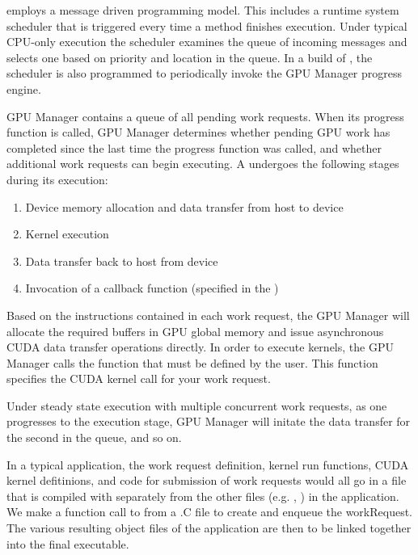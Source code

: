 \documentclass[10pt]{report}
\begin{document}
\charmpp{} employs a message driven programming model. This includes a runtime
system scheduler that is triggered every time a method finishes execution. Under
typical CPU-only execution the scheduler examines the queue of incoming messages
and selects one based on priority and location in the queue. In a \cuda{}
build of \charmpp{}, the scheduler is also programmed to periodically invoke the
GPU Manager progress engine.

GPU Manager contains a queue of all pending work requests. When its progress
function is called, GPU Manager determines whether pending GPU work has
completed since the last time the progress function was called, and whether
additional work requests can begin executing. A  undergoes the
following stages during its execution:

\begin{enumerate}
\item Device memory allocation and data transfer from host to device
\item Kernel execution
\item Data transfer back to host from device
\item Invocation of a callback function (specified in the )
\end{enumerate}

Based on the instructions contained in each work request, the GPU Manager will
allocate the required buffers in GPU global memory and issue asynchronous CUDA
data transfer operations directly. In order to execute kernels, the GPU Manager
calls the  function that must be defined by the user. This
function specifies the CUDA kernel call for your work request.

Under steady state execution with multiple concurrent work requests, as
one  progresses to the execution stage, GPU Manager will
initate the data transfer for the second
 in the queue, and so on.

In a typical application, the work request definition,
kernel run functions, CUDA kernel defitinions, and code for submission
of work requests would all go in a  file that is compiled with
 separately from the other files (e.g. , ) in the
\charmpp{} application.
We make a function call to  from a .C file to create
and enqueue the workRequest.
The various resulting object files of the application are then to be linked
together into the final executable.
\end{document}
